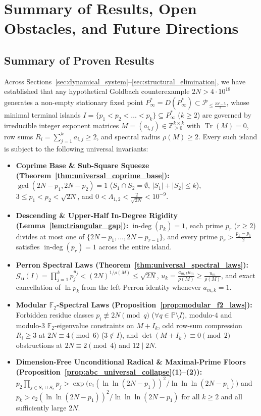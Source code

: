 \documentclass[11pt,a4paper]{article}
\theoremstyle{definition}
\begin{document}
\section{Summary of Results, Open Obstacles, and Future Directions}
\label{sec:conclusion}

\subsection{Summary of Proven Results}
\label{subsec:master_classification}

Across Sections~\ref{sec:dynamical_system}--\ref{sec:structural_elimination}, we have established that any hypothetical Goldbach counterexample $2N > 4 \cdot 10^{18}$ \cite{oliveira2014} generates a non-empty stationary fixed point $P^*_\infty = D(P^*_\infty) \subset \mathcal{P}_{\le \frac{2N-5}{3}}$, whose minimal terminal islands $I = \{p_1 < p_2 < \dots < p_k\} \subseteq P^*_\infty$ ($k \ge 2$) are governed by irreducible integer exponent matrices $M = (a_{i,j}) \in \mathbb{Z}_{\ge 0}^{k \times k}$ with $\operatorname{Tr}(M) = 0$, row sums $R_i = \sum_{j=1}^k a_{i,j} \ge 2$, and spectral radius $\rho(M) \ge 2$. Every such island is subject to the following universal invariants:
\begin{itemize}
    \item \textbf{Coprime Base \& Sub-Square Squeeze (Theorem~\ref{thm:universal_coprime_base}):} $\gcd(2N - p_1, 2N - p_2) = 1$ ($S_1 \cap S_2 = \emptyset$, $|S_1| + |S_2| \le k$), $3 \le p_1 < p_2 < \sqrt{2N}$, and $0 < \Lambda_{1,2} < \frac{2}{\sqrt{2N}} < 10^{-9}$.
    \item \textbf{Descending \& Upper-Half In-Degree Rigidity (Lemma~\ref{lem:triangular_gap}):} $\operatorname{in-deg}(p_k) = 1$, each prime $p_r$ ($r \ge 2$) divides at most one of $\{2N - p_1, \dots, 2N - p_{r-1}\}$, and every prime $p_r > \frac{p_k - p_1}{2}$ satisfies $\operatorname{in-deg}(p_r) = 1$ across the entire island.
    \item \textbf{Perron Spectral Laws (Theorem~\ref{thm:universal_spectral_laws}):} $\mathcal{G}_{\mathbf{u}}(I) = \prod_{j=1}^k p_j^{u_j} < (2N)^{1/\rho(M)} \le \sqrt{2N}$, $u_k = \frac{a_{m,k} u_m}{\rho(M)} \ge \frac{u_m}{\rho(M)}$, and exact cancellation of $\ln p_k$ from the left Perron identity whenever $a_{m,k} = 1$.
    \item \textbf{Modular $\mathbb{F}_2$-Spectral Laws (Proposition~\ref{prop:modular_f2_laws}):} Forbidden residue classes $p_i \not\equiv 2N \pmod q$ ($\forall q \in \mathbb{P} \setminus I$), modulo-$4$ and modulo-$3$ $\mathbb{F}_2$-eigenvalue constraints on $M + I_k$, odd row-sum compression $R_i \ge 3$ at $2N \equiv 4 \pmod 6$ ($3 \notin I$), and $\det(M + I_k) \equiv 0 \pmod 2$ obstructions at $2N \equiv 2 \pmod 4$ and $12 \mid 2N$.
    \item \textbf{Dimension-Free Unconditional Radical \& Maximal-Prime Floors (Proposition~\ref{prop:abc_universal_collapse}(1)--(2)):} $p_2 \prod_{j \in S_1 \cup S_2} p_j > \exp\bigl(c_1 (\ln\ln(2N - p_1))^2 / \ln\ln\ln(2N - p_1)\bigr)$ and $p_k > c_2 (\ln\ln(2N - p_1))^2 / \ln\ln\ln(2N - p_1)$ for all $k \ge 2$ and all sufficiently large $2N$.
\end{itemize}
\end{document}
